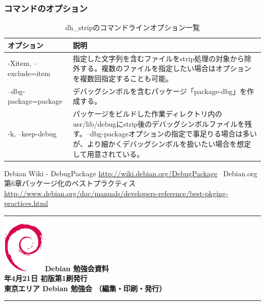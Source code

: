 \documentclass[mingoth,a4paper]{jsarticle}
\newcommand{\debmtgyear}{2012}
\newcommand{\debmtgmonth}{4}
\newcommand{\debmtgdate}{21}
\begin{document}
\subsubsection{コマンドのオプション}

\begin{table}[ht]
\caption{dh\_stripのコマンドラインオプション一覧}
\begin{center}
\small
\begin{tabular}{|p{12em}|p{33em}|}
\hline
オプション&説明 \\
\hline
-Xitem, --exclude=item & 指定した文字列を含むファイルをstrip処理の対象から除外する。複数のファイルを指定したい場合はオプションを複数回指定することも可能。\\
\hline
--dbg-package=package & デバッグシンボルを含むパッケージ「package-dbg」を作成する。 \\
\hline
-k, --keep-debug & パッケージをビルドした作業ディレクトリ内のusr/lib/debugにstrip後のデバッグシンボルファイルを残す。--dbg-packageオプションの指定で事足りる場合は多いが、より細かくデバッグシンボルを扱いたい場合を想定して用意されている。 \\
\end{tabular}
\end{center}
\end{table}

\begin{thebibliography}{0}
 Debian Wiki - DebugPackage \url{http://wiki.debian.org/DebugPackage}\
 Debian.org 第6章パッケージ化のベストプラクティス \url{http://www.debian.org/doc/manuals/developers-reference/best-pkging-practices.html}
\end{thebibliography}


\printindex

\cleartooddpage

\vspace*{15cm}
\hrule
\vspace{2mm}
\includegraphics[width=2cm]{image200502/openlogo-nd.eps}
\noindent \Large \bf Debian 勉強会資料\\
\noindent \normalfont \debmtgyear{}年\debmtgmonth{}月\debmtgdate{}日 \hspace{5mm}  初版第1刷発行\\
\noindent \normalfont 東京エリア Debian 勉強会 （編集・印刷・発行）\\
\hrule
\end{document}
